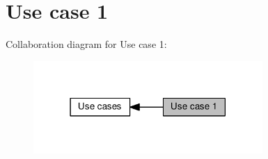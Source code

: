 \hypertarget{group__usecase1}{}\section{Use case 1}
\label{group__usecase1}
Collaboration diagram for Use case 1\+:\nopagebreak
\begin{figure}[H]
\begin{center}
\leavevmode
\includegraphics[width=247pt]{group__usecase1}
\end{center}
\end{figure}



